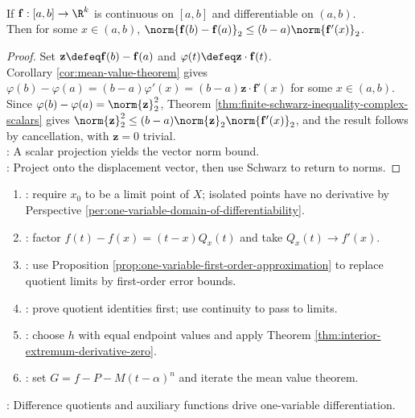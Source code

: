 \begin{theorem} \label{thm:vector-valued-mean-value-inequality} \\
If $\mathbf{f}:[a,b]\to\R^k$ is continuous on $[a,b]$ and differentiable on $(a,b)$.\\
Then for some $x\in(a,b)$, $\norm{\mathbf{f}(b)-\mathbf{f}(a)}_2\leq (b-a)\norm{\mathbf{f}'(x)}_2$.
\begin{proof}
Set $\mathbf{z}\defeq\mathbf{f}(b)-\mathbf{f}(a)$ and $\varphi(t)\defeq\mathbf{z}\cdot\mathbf{f}(t)$.\\
Corollary \ref{cor:mean-value-theorem} gives $\varphi(b)-\varphi(a)=(b-a)\varphi'(x)=(b-a)\mathbf{z}\cdot\mathbf{f}'(x)$ for some $x\in(a,b)$. Since $\varphi(b)-\varphi(a)=\norm{\mathbf{z}}_2^2$, Theorem \ref{thm:finite-schwarz-inequality-complex-scalars} gives $\norm{\mathbf{z}}_2^2\leq(b-a)\norm{\mathbf{z}}_2\norm{\mathbf{f}'(x)}_2$, and the result follows by cancellation, with $\mathbf{z}=0$ trivial.\\
: A scalar projection yields the vector norm bound.\\
: Project onto the displacement vector, then use Schwarz to return to norms.
\end{proof}
\end{theorem}

\begin{method} \label{meth:one-variable-differentiation-no-overlap-source-todo}\label{meth:one-variable-differentiation-proof-patterns} 
\begin{enumerate}[label=(\roman*)]
\setlength{\itemsep}{0pt}
\item {}: require $x_0$ to be a limit point of $X$; isolated points have no derivative by Perspective \ref{per:one-variable-domain-of-differentiability}.
\item {}: factor $f(t)-f(x)=(t-x)Q_x(t)$ and take $Q_x(t)\to f'(x)$.
\item {}: use Proposition \ref{prop:one-variable-first-order-approximation} to replace quotient limits by first-order error bounds.
\item {}: prove quotient identities first; use continuity to pass to limits.
\item {}: choose $h$ with equal endpoint values and apply Theorem \ref{thm:interior-extremum-derivative-zero}.
\item {}: set $G=f-P-M(t-\alpha)^n$ and iterate the mean value theorem.
\end{enumerate}
: Difference quotients and auxiliary functions drive one-variable differentiation.
\end{method}
